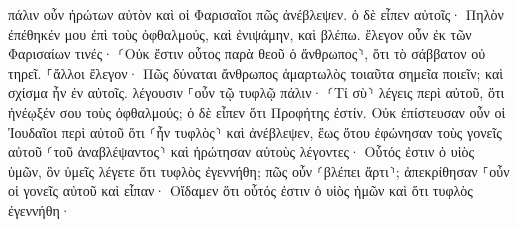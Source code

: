 \documentclass{openreader}
\begin{document}
πάλιν οὖν ἠρώτων αὐτὸν καὶ οἱ Φαρισαῖοι πῶς ἀνέβλεψεν. ὁ δὲ εἶπεν αὐτοῖς· Πηλὸν ἐπέθηκέν μου ἐπὶ τοὺς ὀφθαλμούς, καὶ ἐνιψάμην, καὶ βλέπω. 
ἔλεγον οὖν ἐκ τῶν Φαρισαίων τινές· ⸂Οὐκ ἔστιν οὗτος παρὰ θεοῦ ὁ ἄνθρωπος⸃, ὅτι τὸ σάββατον οὐ τηρεῖ. ⸀ἄλλοι ἔλεγον· Πῶς δύναται ἄνθρωπος ἁμαρτωλὸς τοιαῦτα σημεῖα ποιεῖν; καὶ σχίσμα ἦν ἐν αὐτοῖς. 
λέγουσιν ⸀οὖν τῷ τυφλῷ πάλιν· ⸂Τί σὺ⸃ λέγεις περὶ αὐτοῦ, ὅτι ἠνέῳξέν σου τοὺς ὀφθαλμούς; ὁ δὲ εἶπεν ὅτι Προφήτης ἐστίν. 
Οὐκ ἐπίστευσαν οὖν οἱ Ἰουδαῖοι περὶ αὐτοῦ ὅτι ⸂ἦν τυφλὸς⸃ καὶ ἀνέβλεψεν, ἕως ὅτου ἐφώνησαν τοὺς γονεῖς αὐτοῦ ⸂τοῦ ἀναβλέψαντος⸃ 
καὶ ἠρώτησαν αὐτοὺς λέγοντες· Οὗτός ἐστιν ὁ υἱὸς ὑμῶν, ὃν ὑμεῖς λέγετε ὅτι τυφλὸς ἐγεννήθη; πῶς οὖν ⸂βλέπει ἄρτι⸃; 
ἀπεκρίθησαν ⸀οὖν οἱ γονεῖς αὐτοῦ καὶ εἶπαν· Οἴδαμεν ὅτι οὗτός ἐστιν ὁ υἱὸς ἡμῶν καὶ ὅτι τυφλὸς ἐγεννήθη· 
\end{document}
